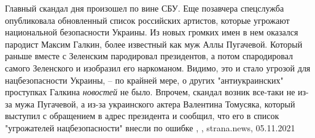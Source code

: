 Главный скандал дня произошел по вине СБУ. Еще позавчера спецслужба
опубликовала обновленный список российских артистов, которые угрожают
национальной безопасности Украины.  Из новых громких имен в нем оказался
пародист Максим Галкин, более известный как муж Аллы Пугачевой. Который раньше
вместе с Зеленским пародировал президентов, а потом спародировал самого
Зеленского и изобразил его наркоманом.  Видимо, это и стало угрозой для
нацбезопасности Украины, – по крайней мере, о других "антиукраинских"
проступках Галкина \emph{новостей} не было.  Впрочем, скандал возник все-таки
не из-за мужа Пугачевой, а из-за украинского актера Валентина Томусяка, который
выступил с обращением в адрес президента и сообщил, что его в список
"угрожателей нацбезопасности" внесли по ошибке
, 
, strana.news, 05.11.2021
